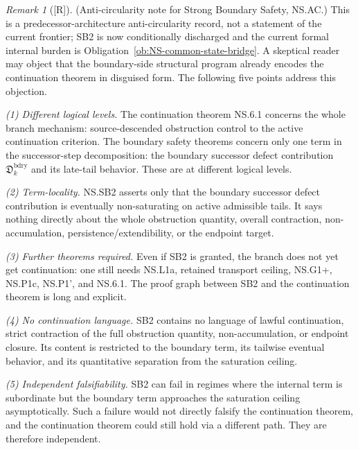 \documentclass[12pt,oneside]{amsbook}
\theoremstyle{plain}
\theoremstyle{definition}
\theoremstyle{remark}
\newtheorem{remark}[theorem]{Remark}
\newcommand{\status}[1]{\textup{[#1]}}
\begin{document}
\begin{remark}[\status{R}]\label{rmk:AC}
\textup{(Anti-circularity note for Strong Boundary Safety,
NS.AC.)} This is a predecessor-architecture anti-circularity record,
not a statement of the current frontier; SB2 is now conditionally
discharged and the current formal internal burden is
Obligation~\ref{ob:NS-common-state-bridge}. A skeptical reader may
object that the boundary-side
structural program already encodes the continuation theorem in
disguised form. The following five points address this
objection.

\emph{(1) Different logical levels.} The continuation theorem
NS.6.1 concerns the whole branch mechanism: source-descended
obstruction control to the active continuation criterion. The
boundary safety theorems concern only one term in the
successor-step decomposition: the boundary successor defect
contribution $\mathfrak{D}_k^{\mathrm{bdry}}$ and its late-tail
behavior. These are at different logical levels.

\emph{(2) Term-locality.} NS.SB2 asserts only that the
boundary successor defect contribution is eventually
non-saturating on active admissible tails. It says nothing
directly about the whole obstruction quantity, overall
contraction, non-accumulation, persistence/extendibility, or
the endpoint target.

\emph{(3) Further theorems required.} Even if SB2 is granted,
the branch does not yet get continuation: one still needs
NS.L1a, retained transport ceiling, NS.G1+, NS.P1c, NS.P1', and
NS.6.1. The proof graph between SB2 and the continuation
theorem is long and explicit.

\emph{(4) No continuation language.} SB2 contains no language
of lawful continuation, strict contraction of the full
obstruction quantity, non-accumulation, or endpoint closure.
Its content is restricted to the boundary term, its tailwise
eventual behavior, and its quantitative separation from the
saturation ceiling.

\emph{(5) Independent falsifiability.} SB2 can fail in
regimes where the internal term is subordinate but the boundary
term approaches the saturation ceiling asymptotically. Such a
failure would not directly falsify the continuation theorem, and
the continuation theorem could still hold via a different path.
They are therefore independent.
\end{remark}

\end{document}
